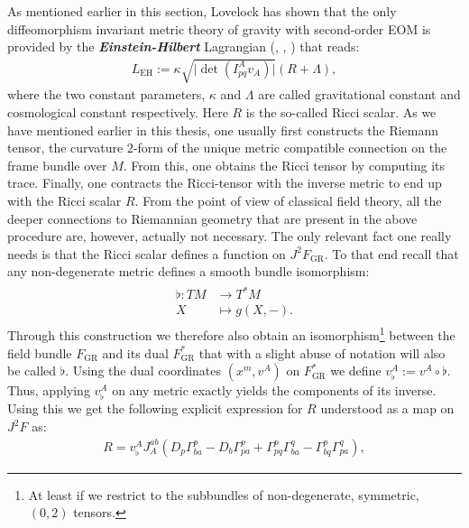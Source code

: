 As mentioned earlier in this section, Lovelock has shown that the only diffeomorphism invariant metric theory of gravity with second-order EOM is provided by the \textit{\textbf{Einstein-Hilbert}} Lagrangian (\cite{Lovelock1969}, \cite{doi:10.1063/1.1665613}, \cite{doi:10.1063/1.1666069}) that reads:
\begin{align}
    L_{\text{EH}} := \kappa \sqrt{\vert \operatorname{det} \left ( I^A_{pq}v_A \right ) \vert }  \left( R + \Lambda \right ),
\end{align}
where the two constant parameters, $\kappa$ and $\Lambda$ are called gravitational constant and cosmological constant respectively. Here $R$ is the so-called Ricci scalar. As we have mentioned earlier in this thesis, one usually first constructs the Riemann tensor, the curvature  $2$-form of the unique metric compatible connection on the frame bundle over $M$. From this, one obtains the Ricci tensor by computing its trace. Finally, one contracts the Ricci-tensor with the inverse metric to end up with the Ricci scalar $R$. From the point of view of classical field theory, all the deeper connections to Riemannian geometry that are present in the above procedure are, however, actually not necessary. The only relevant fact one really needs is that the Ricci scalar defines a function on $J^2F_{\text{GR}}$. To that end recall that any non-degenerate metric defines a smooth bundle isomorphism:
\begin{align}\label{music}
\begin{aligned}
\flat : TM &\longrightarrow T^{\ast}M\\
X &\longmapsto g(X,-) .
\end{aligned}
\end{align}
Through this construction we therefore also obtain an isomorphism\footnote{At least if we restrict to the subbundles of non-degenerate, symmetric, $(0,2)$ tensors.} between the field bundle $F_{\text{GR}}$ and its dual $F_{\text{GR}}^{\ast}$ that with a slight abuse of notation will also be called $\flat$. 
Using the dual coordinates $(x^m,v^A)$ on $F_{\text{GR}}^{\ast}$ we define $v^A_{\flat} := v^A \circ \flat$. Thus, applying $v^A_{\flat}$ on any metric exactly yields the components of its inverse. Using this we get the following explicit expression for $R$ understood as a map on $J^2F$ as:
\begin{align}
R = v_{\flat}^A J_A^{ab} \left ( D_p \Gamma^p_{ba} - D_b \Gamma^p_{pa} + \Gamma^p_{pq} \Gamma^q_{ba} - \Gamma^p_{bq} \Gamma^q_{pa} \right ),
\end{align}

